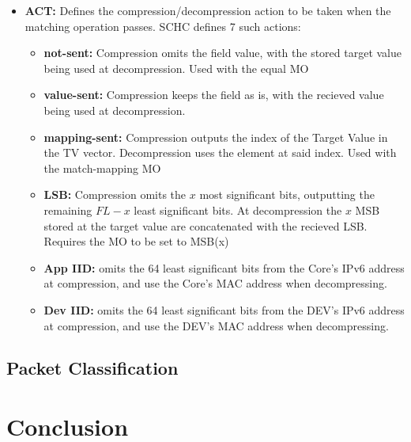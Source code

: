 \documentclass[cspaper]{IEEEtran}
\numberwithin{equation}{subsection}
\begin{document}
\begin{itemize}
		\item \textbf{ACT:}
				Defines the compression/decompression action to be taken when the matching operation passes. SCHC defines 7 such actions:
				
			\begin{adjustwidth}{1em}{0em}
				\begin{itemize}
					\item \textbf{not-sent:} Compression omits the field value, with the stored target value being used at decompression. Used with the equal MO
					\item \textbf{value-sent:} Compression keeps the field as is,  with the recieved value being used at decompression.
					\item \textbf{mapping-sent:} Compression outputs the index of the Target Value in the TV vector. Decompression uses the element at said index. Used with the 
						match-mapping MO
					\item \textbf{LSB:} Compression omits the $x$ most significant bits, outputting the remaining $FL-x$ least significant bits. At decompression the $x$ MSB stored
						at the target value are concatenated with the recieved LSB. Requires the MO to be set to MSB(x) 
					
					\item \textbf{App IID:} omits the 64 least significant bits from the Core's IPv6 address at compression, and use the Core's MAC address when decompressing.
					\item \textbf{Dev IID:} omits the 64 least significant bits from the DEV's IPv6 address at compression, and use the DEV's MAC address when decompressing.

				\end{itemize}
			\end{adjustwidth}
	\end{itemize}

	\subsection{Packet Classification}
		

\section{Conclusion}
\end{document}
